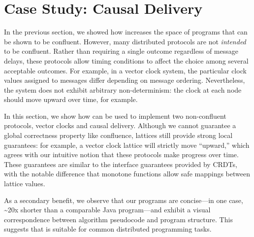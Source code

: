 \section{Case Study: Causal Delivery}
\label{sec:causal}

In the previous section, we showed how \lang increases the space of programs
that can be shown to be confluent. However, many distributed protocols are not
\emph{intended} to be confluent. Rather than requiring a single outcome
regardless of message delays, these protocols allow timing conditions to affect
the choice among several acceptable outcomes. For example, in a vector clock
system, the particular clock values assigned to messages differ depending on
message ordering. Nevertheless, the system does not exhibit arbitrary
non-determinism: the clock at each node should move upward over time, for
example.

In this section, we show how \lang can be used to implement two non-confluent
protocols, vector clocks and causal delivery. Although we cannot guarantee a
global correctness property like confluence, lattices still provide strong local
guarantees: for example, a vector clock lattice will strictly move ``upward,''
which agrees with our intuitive notion that these protocols make progress over
time. These guarantees are similar to the interface guarantees provided by
CRDTs, with the notable difference that monotone functions allow safe mappings
between lattice values.

As a secondary benefit, we observe that our programs are concise---in one case,
\textasciitilde{}20x shorter than a comparable Java program---and exhibit a
visual correspondence between algorithm pseudocode and program structure. This
suggests that \lang is suitable for common distributed programming tasks.


